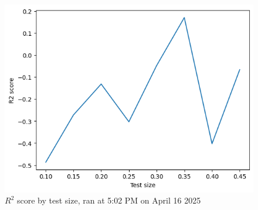 \documentclass[runningheads]{llncs}
\begin{document}
\begin{figure}
    \centering
    \includegraphics[scale=0.75]{R2_502pm.png}   
    \caption{\(R^2\) score by test size, ran at 5:02 PM on April 16 2025}
    \label{fig:r2_later_label}
\end{figure}
\end{document}
